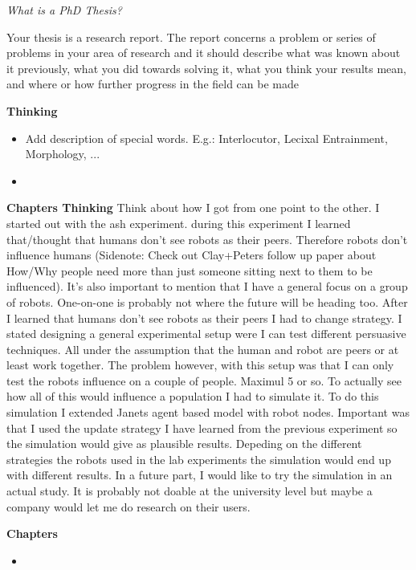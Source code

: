 \textit{What is a PhD Thesis?} 

Your thesis is a research report. The report concerns a problem or series of problems in your area of research and it should describe what was known about it previously, what you did towards solving it, what you think your results mean, and where or how further progress in the field can be made

\textbf{Thinking}
\begin{itemize}
\item Add description of special words. E.g.: Interlocutor, Lecixal Entrainment, Morphology, ...
\item
\end{itemize}

\textbf{Chapters Thinking}
Think about how I got from one point to the other. I started out with the ash experiment. during this experiment I learned that/thought that humans don't see robots as their peers. Therefore robots don't influence humans (Sidenote: Check out Clay+Peters follow up paper about How/Why people need more than just someone sitting next to them to be influenced). It's also important to mention that I have a general focus on a group of robots. One-on-one is probably not where the future will be heading too. After I learned that humans don't see robots as their peers I had to change strategy. I stated designing a general experimental setup were I can test different persuasive techniques. All under the assumption that the human and robot are peers or at least work together. The problem however, with this setup was that I can only test the robots influence on a couple of people. Maximul 5 or so. To actually see how all of this would influence a population I had to simulate it. To do this simulation I extended Janets agent based model with robot nodes. Important was that I used the update strategy I have learned from the previous experiment so the simulation would give as plausible results. Depeding on the different strategies the robots used in the lab experiments the simulation would end up with different results. 
In a future part, I would like to try the simulation in an actual study. It is probably not doable at the university level but maybe a company would let me do research on their users.

\textbf{Chapters}
\begin{itemize}
\item 
\end{itemize}